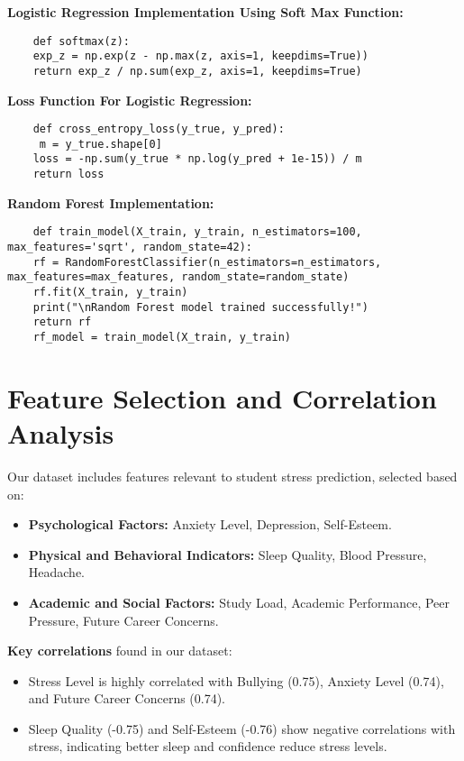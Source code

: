 \documentclass[a4paper,11pt]{article}
\begin{document}
\textbf{Logistic Regression Implementation Using Soft Max Function:}
\begin{lstlisting}
    def softmax(z):
    exp_z = np.exp(z - np.max(z, axis=1, keepdims=True))  
    return exp_z / np.sum(exp_z, axis=1, keepdims=True)
\end{lstlisting}

\textbf{Loss Function For Logistic Regression:}
\begin{lstlisting}
    def cross_entropy_loss(y_true, y_pred):
     m = y_true.shape[0]
    loss = -np.sum(y_true * np.log(y_pred + 1e-15)) / m
    return loss
\end{lstlisting}

\textbf{Random Forest Implementation:}
\begin{lstlisting}
    def train_model(X_train, y_train, n_estimators=100, max_features='sqrt', random_state=42):
    rf = RandomForestClassifier(n_estimators=n_estimators, max_features=max_features, random_state=random_state)
    rf.fit(X_train, y_train)
    print("\nRandom Forest model trained successfully!")
    return rf
    rf_model = train_model(X_train, y_train)
\end{lstlisting}

\section{Feature Selection and Correlation Analysis}
Our dataset includes features relevant to student stress prediction, selected based on:
\begin{itemize}
    \item \textbf{Psychological Factors:} Anxiety Level, Depression, Self-Esteem.
    \item \textbf{Physical and Behavioral Indicators:} Sleep Quality, Blood Pressure, Headache.
    \item \textbf{Academic and Social Factors:} Study Load, Academic Performance, Peer Pressure, Future Career Concerns.
\end{itemize}

\textbf{Key correlations} found in our dataset:
\begin{itemize}
    \item Stress Level is highly correlated with Bullying (0.75), Anxiety Level (0.74), and Future Career Concerns (0.74).
    \item Sleep Quality (-0.75) and Self-Esteem (-0.76) show negative correlations with stress, indicating better sleep and confidence reduce stress levels.
\end{itemize}
\end{document}
